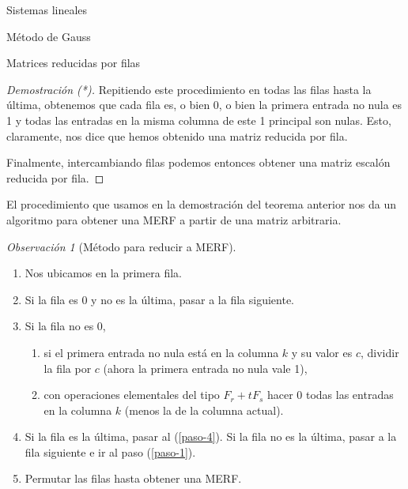 \documentclass[a4paper,12pt,twoside,spanish,reqno]{amsbook}
\theoremstyle{definition}
\theoremstyle{remark}
\newtheorem{observacion}{Observaci\'on}[section]
\begin{document}
\begin{chapter}{Sistemas lineales}
\begin{section}{Método de Gauss }
\begin{subsection}{Matrices reducidas por filas}
\begin{proof}[Demostración (*)]
					Repitiendo este procedimiento en todas las filas hasta la última, obtenemos que cada fila es, o bien 0, o bien la primera entrada no nula es  1 y todas las entradas en la misma columna de este 1 principal son nulas.   Esto, claramente, nos dice que hemos obtenido una matriz reducida por fila.  
					
				 Finalmente, intercambiando filas podemos entonces obtener una matriz escalón reducida por fila.

					
				\end{proof}
				
				El procedimiento que usamos en la demostración del teorema anterior nos da un algoritmo para obtener una MERF a partir de una matriz arbitraria.
				
				\begin{observacion}[\sc Método para reducir a MERF] \label{metodo-merf}  
					\
									
				\begin{enumerate}
					\item \label{paso-0} Nos ubicamos en la primera fila.
					\item \label{paso-1} Si la fila es 0 y no es la última, pasar a la fila siguiente.
					\item \label{paso-2} Si la fila no es 0, 
					\begin{enumerate}
						\item si el primera entrada no nula está en  la columna $k$ y su valor es $c$, dividir la fila por $c$ (ahora la primera entrada no nula vale 1),
						\item con operaciones elementales del tipo $F_r+ tF_s$ hacer 0  todas las entradas en la columna $k$ (menos la de la columna actual).    
					\end{enumerate}
					\item \label{paso-3} Si la fila es la última, pasar al (\ref{paso-4}). Si la fila no es la última, pasar a la fila siguiente e ir al paso (\ref{paso-1}).  
					\item \label{paso-4} Permutar las filas hasta obtener una MERF. 
				\end{enumerate}
			\end{observacion}
				

\end{subsection}
\end{section}
\end{chapter}
\end{document}
